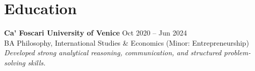 \documentclass[a4paper,10pt]{article}
\begin{document}
\section{Education}
\textbf{Ca' Foscari University of Venice} \hfill Oct 2020 -- Jun 2024\\
BA Philosophy, International Studies \& Economics (Minor: Entrepreneurship) \\
\textit{Developed strong analytical reasoning, communication, and structured problem-solving skills.}
\end{document}
